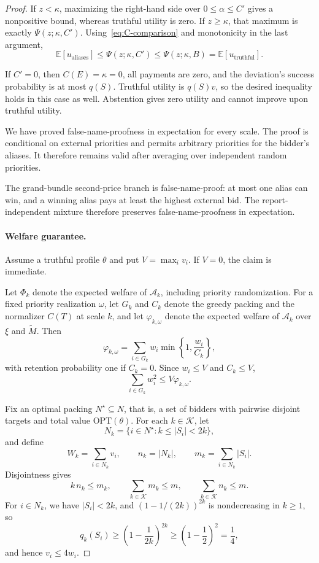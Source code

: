 \documentclass[format=acmsmall, review=false]{acmart}
\newcommand{\E}{\mathbb{E}}
\newcommand{\OPT}{\mathrm{OPT}}
\begin{document}
\begin{proof}
If \(z<\kappa\), maximizing the right-hand side over
\(0\le\alpha\le C'\) gives a nonpositive bound, whereas truthful
utility is zero. If \(z\ge\kappa\), that maximum is exactly
\(\Psi(z;\kappa,C')\). Using~\eqref{eq:C-comparison} and
monotonicity in the last argument,
\[
\E[u_{\mathrm{aliases}}]
\le
\Psi(z;\kappa,C')
\le
\Psi(z;\kappa,B)
=
\E[u_{\mathrm{truthful}}].
\]

If \(C'=0\), then \(C(E)=\kappa=0\), all payments are zero, and the
deviation's success probability is at most \(q(S)\).
Truthful utility is \(q(S)v\), so the desired inequality
holds in this case as well. Abstention gives zero utility
and cannot improve upon truthful utility.

We have proved false-name-proofness in expectation for
every scale. The proof is conditional on external priorities
and permits arbitrary priorities for the bidder's aliases.
It therefore remains valid after averaging over independent
random priorities.

The grand-bundle second-price branch is false-name-proof:
at most one alias can win, and a winning alias pays at least
the highest external bid. The report-independent mixture
therefore preserves false-name-proofness in expectation.

\paragraph{Welfare guarantee.}

Assume a truthful profile \(\theta\) and put \(V=\max_i v_i\).
If \(V=0\), the claim is immediate.

Let \(\Phi_k\) denote the expected welfare of \(\mathcal A_k\),
including priority randomization. For a fixed priority
realization \(\omega\), let \(G_k\) and \(C_k\) denote the greedy
packing and the normalizer \(C(T)\) at scale \(k\), and let
\(\varphi_{k,\omega}\) denote the
expected welfare of \(\mathcal A_k\) over \(\xi\) and \(\widetilde M\). Then
\[
\varphi_{k,\omega}
=
\sum_{i\in G_k}
w_i\min\left\{1,\frac{w_i}{C_k}\right\},
\]
with retention probability one if \(C_k=0\).
Since \(w_i\le V\) and \(C_k\le V\),
\begin{equation}\label{eq:squares}
\sum_{i\in G_k}w_i^2\le V\varphi_{k,\omega}.
\end{equation}

Fix an optimal packing \(N^\star\subseteq N\), that is, a set of
bidders with pairwise disjoint targets and total value
\(\OPT(\theta)\). For each
\(k\in\mathcal K\), let
\[
N_k=\{i\in N^\star:k\le |S_i|<2k\},
\]
and define
\[
W_k=\sum_{i\in N_k}v_i,\qquad
n_k=|N_k|,\qquad
m_k=\sum_{i\in N_k}|S_i|.
\]
Disjointness gives
\begin{equation}\label{eq:mass}
k\,n_k\le m_k,\qquad
\sum_{k\in\mathcal K}m_k\le m,\qquad
\sum_{k\in\mathcal K}n_k\le m.
\end{equation}
For \(i\in N_k\), we have \(|S_i|<2k\), and
\((1-1/(2k))^{2k}\) is nondecreasing in \(k\ge1\), so
\[
q_k(S_i)
\ge
\left(1-\frac{1}{2k}\right)^{2k}
\ge\left(1-\frac12\right)^{2}
=\frac14,
\]
and hence \(v_i\le4w_i\).


\end{proof}
\end{document}

